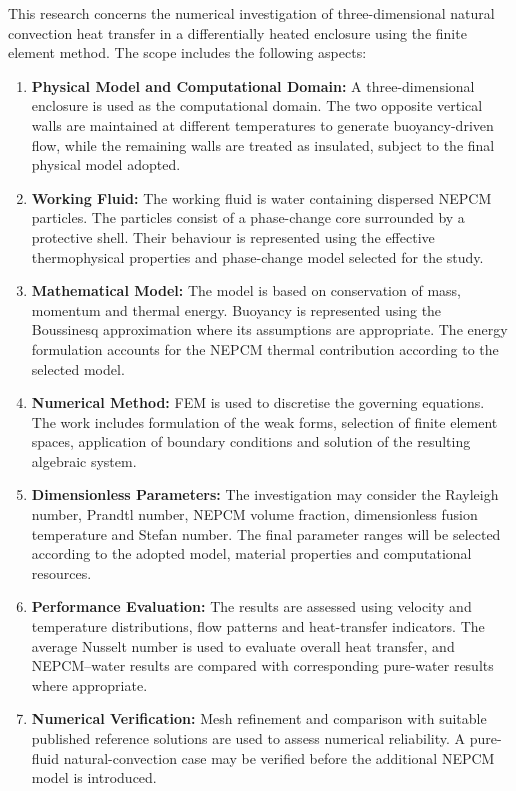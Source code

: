 This research concerns the numerical investigation of three-dimensional natural convection heat transfer in a differentially heated enclosure using the finite element method. The scope includes the following aspects:

\begin{enumerate}
    \item \textbf{Physical Model and Computational Domain:} A three-dimensional enclosure is used as the computational domain. The two opposite vertical walls are maintained at different temperatures to generate buoyancy-driven flow, while the remaining walls are treated as insulated, subject to the final physical model adopted.
    \item \textbf{Working Fluid:} The working fluid is water containing dispersed NEPCM particles. The particles consist of a phase-change core surrounded by a protective shell. Their behaviour is represented using the effective thermophysical properties and phase-change model selected for the study.
    \item \textbf{Mathematical Model:} The model is based on conservation of mass, momentum and thermal energy. Buoyancy is represented using the Boussinesq approximation where its assumptions are appropriate. The energy formulation accounts for the NEPCM thermal contribution according to the selected model.
    \item \textbf{Numerical Method:} FEM is used to discretise the governing equations. The work includes formulation of the weak forms, selection of finite element spaces, application of boundary conditions and solution of the resulting algebraic system.
    \item \textbf{Dimensionless Parameters:} The investigation may consider the Rayleigh number, Prandtl number, NEPCM volume fraction, dimensionless fusion temperature and Stefan number. The final parameter ranges will be selected according to the adopted model, material properties and computational resources.
    \item \textbf{Performance Evaluation:} The results are assessed using velocity and temperature distributions, flow patterns and heat-transfer indicators. The average Nusselt number is used to evaluate overall heat transfer, and NEPCM--water results are compared with corresponding pure-water results where appropriate.
    \item \textbf{Numerical Verification:} Mesh refinement and comparison with suitable published reference solutions are used to assess numerical reliability. A pure-fluid natural-convection case may be verified before the additional NEPCM model is introduced.
\end{enumerate}

